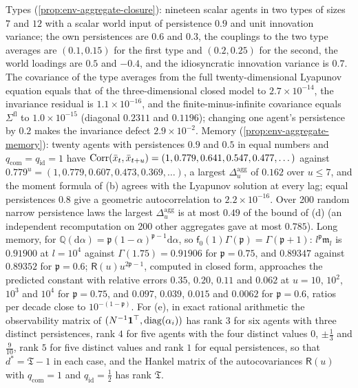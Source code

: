 \begin{numcheck}[Aggregates]\label{chk:env-aggregates}
Types (\cref{prop:env-aggregate-closure}): nineteen scalar agents in two types of sizes $7$ and $12$ with a scalar world input of persistence $0.9$ and unit innovation variance; the own persistences are $0.6$ and $0.3$, the couplings to the two type averages are $(0.1,0.15)$ for the first type and $(0.2,0.25)$ for the second, the world loadings are $0.5$ and $-0.4$, and the idiosyncratic innovation variance is $0.7$. The covariance of the type averages from the full twenty-dimensional Lyapunov equation equals that of the three-dimensional closed model to $2.7\times10^{-14}$, the invariance residual is $1.1\times10^{-16}$, and the finite-minus-infinite covariance equals $\Sigma^{\mathrm{fl}}$ to $1.0\times10^{-15}$ (diagonal $0.2311$ and $0.1196$); changing one agent's persistence by $0.2$ makes the invariance defect $2.9\times10^{-2}$. Memory (\cref{prop:env-aggregate-memory}): twenty agents with persistences $0.9$ and $0.5$ in equal numbers and $q_{\mathrm{com}}=q_{\mathrm{id}}=1$ have $\operatorname{Corr}(\bar x_t,\bar x_{t+u})=(1,0.779,0.641,0.547,0.477,\dots)$ against $0.779^u=(1,0.779,0.607,0.473,0.369,\dots)$, a largest $\Delta^{\mathrm{agg}}_u$ of $0.162$ over $u\le7$, and the moment formula of (b) agrees with the Lyapunov solution at every lag; equal persistences $0.8$ give a geometric autocorrelation to $2.2\times10^{-16}$. Over 200 random narrow persistence laws the largest $\Delta^{\mathrm{agg}}_u$ is at most $0.49$ of the bound of (d) (an independent recomputation on 200 other aggregates gave at most $0.785$). Long memory, for $\mathbb Q(\mathrm d\alpha)=\mathfrak p(1-\alpha)^{\mathfrak p-1}\mathrm d\alpha$, so $\mathsf f_0(1)\Gamma(\mathfrak p)=\Gamma(\mathfrak p+1)$: $l^{\mathfrak p}\mathfrak m_l$ is $0.91900$ at $l=10^4$ against $\Gamma(1.75)=0.91906$ for $\mathfrak p=0.75$, and $0.89347$ against $0.89352$ for $\mathfrak p=0.6$; $\mathsf R(u)u^{2\mathfrak p-1}$, computed in closed form, approaches the predicted constant with relative errors $0.35$, $0.20$, $0.11$ and $0.062$ at $u=10$, $10^2$, $10^3$ and $10^4$ for $\mathfrak p=0.75$, and $0.097$, $0.039$, $0.015$ and $0.0062$ for $\mathfrak p=0.6$, ratios per decade close to $10^{-(1-\mathfrak p)}$. For (e), in exact rational arithmetic the observability matrix of $(N^{-1}\mathbf{1}^\top,\operatorname{diag}(\alpha_i))$ has rank $3$ for six agents with three distinct persistences, rank $4$ for five agents with the four distinct values $0$, $\pm\frac13$ and $\frac9{10}$, rank $5$ for five distinct values and rank $1$ for equal persistences, so that $d^\ast=\mathfrak T-1$ in each case, and the Hankel matrix of the autocovariances $\mathsf R(u)$ with $q_{\mathrm{com}}=1$ and $q_{\mathrm{id}}=\frac12$ has rank $\mathfrak T$.
\end{numcheck}

